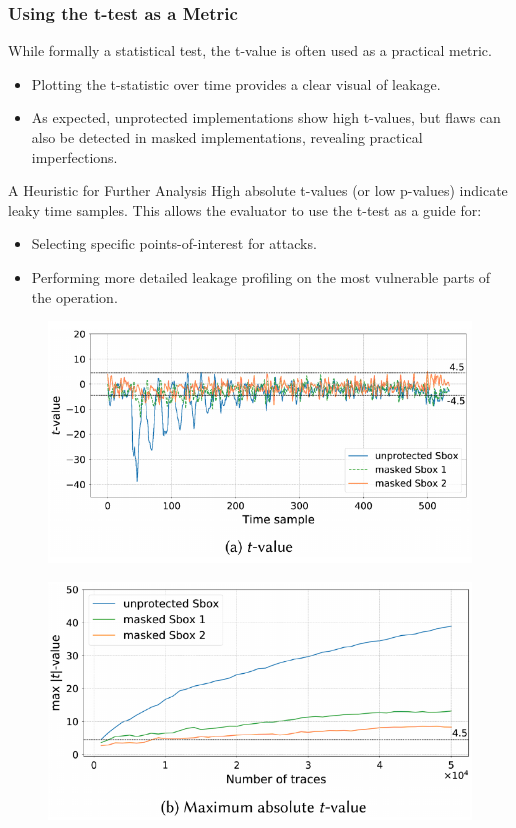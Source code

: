 \begin{frame}
    \frametitle{Using the t-test as a Metric}

    While formally a statistical test, the t-value is often used as a practical metric.
    
    \begin{itemize}
        \item Plotting the t-statistic over time provides a clear visual of leakage.
        \item As expected, unprotected implementations show high t-values, but flaws can also be detected in masked implementations, revealing practical imperfections.
    \end{itemize}
    
    \begin{alertblock}{A Heuristic for Further Analysis}
        High absolute t-values (or low p-values) indicate leaky time samples. This allows the evaluator to use the t-test as a guide for:
        \begin{itemize}
            \item Selecting specific points-of-interest for attacks.
            \item Performing more detailed leakage profiling on the most vulnerable parts of the operation.
        \end{itemize}
    \end{alertblock}
\end{frame}

\begin{frame}{}
    \begin{figure}
        \centering
        \includegraphics[width=0.65\linewidth]{metrics/Pictures/t_tet1.png}
        \label{fig:placeholder}
    \end{figure}
    \begin{figure}
        \centering
        \includegraphics[width=0.65\linewidth]{metrics/Pictures/t_tet2.png}
        \label{fig:placeholder}
    \end{figure}
\end{frame}


